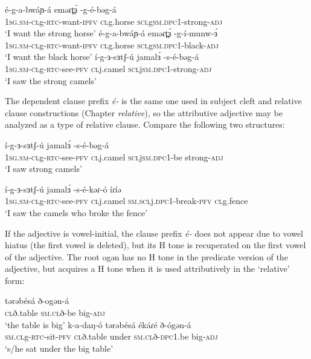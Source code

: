 \ea %
	\ea \gll	é-g-a-bwáɲ-á 	eməɾt̪ɜ́ 	-g-é-bəg-á \\
				1\textsc{sg}.\textsc{sm}-\textsc{cl}g-\textsc{rtc}-want-\textsc{\textsc{ipfv}}  	\textsc{cl}g.horse	\textsc{scl}g\textsc{sm}.\textsc{dpc}1-strong-\textsc{adj}\\
		\glt	‘I want the strong horse’
	\ex	\gll	é-g-a-bwáɲ-á 	eməɾt̪ɜ́ 	-g-í-munw-ɜ́\\
				1\textsc{sg}.\textsc{sm}-\textsc{cl}g-\textsc{rtc}-want-\textsc{\textsc{ipfv}}  	\textsc{cl}g.horse	\textsc{scl}g\textsc{sm}.\textsc{dpc}1-black-\textsc{adj}\\
		\glt	‘I want the black horse’
	\ex	\gll	í-g-ɜ-sɜtʃ-ú 	jamalɜ́ 	-s-é-bəg-á\\
				1\textsc{sg}.\textsc{sm}-\textsc{cl}g-\textsc{rtc}-see-\textsc{pfv}  	\textsc{cl}j.camel	\textsc{scl}j\textsc{sm}.\textsc{dpc}1-strong-\textsc{adj}\\
		\glt 	‘I saw the strong camels’
	\z
\z

The dependent clause prefix \textit{é-} is the same one used in subject cleft and relative clause constructions (Chapter \textit{relative}), so the attributive adjective may be analyzed as a type of relative clause. Compare the following two structures:

\ea %
	\ea \gll	í-g-ɜ-sɜtʃ-ú 	jamalɜ́ 	-s-é-bəg-á \\
				1\textsc{sg}.\textsc{sm}-\textsc{cl}g-\textsc{rtc}-see-\textsc{pfv}  	\textsc{cl}j.camel	\textsc{scl}j\textsc{sm}.\textsc{dpc}1-be strong-\textsc{adj}\\
		\glt ‘I saw strong camels’

	\ex \gll 	í-g-ɜ-sɜtʃ-ú 	jamalɜ́ 	-s-é-kəɾ-ó 	íɾíə\\
			1\textsc{sg}.\textsc{sm}-\textsc{cl}g-\textsc{rtc}-see-\textsc{pfv}  	\textsc{cl}j.camel	\textsc{sm}.\textsc{scl}j.\textsc{dpc}1-break-\textsc{pfv} \textsc{cl}g.fence\\
		\glt 	‘I saw the camels who broke the fence’
	\z
\z

If the adjective is vowel-initial, the clause prefix \textit{é-} does not appear due to vowel hiatus (the first vowel is deleted), but its H tone is recuperated on the first vowel of the adjective. The root ogən has no H tone in the predicate version of the adjective, but acquires a H tone when it is used attributively in the ‘relative’ form:

\ea %
	\ea \gll	tərəbésá 	ð-ogən-á	\\
	\textsc{cl}ð.table 	\textsc{sm}.\textsc{cl}ð-be big-\textsc{adj}	\\
		\glt	‘the table is big’
	\ex \gll	k-a-daŋ-ó 	tərəbésá 	ékáɾé 	ð-ógən-á \\
			\textsc{sm}.\textsc{cl}g-\textsc{rtc}-sit-\textsc{pfv}	\textsc{cl}ð.table 	under	\textsc{sm}.\textsc{cl}ð-\textsc{dpc}1.be big-\textsc{adj}\\	
		\glt	‘s/he sat under the big table’	
	\z
\z

